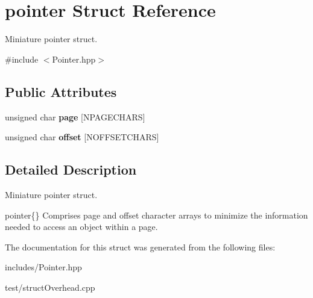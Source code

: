 \hypertarget{structpointer}{}\section{pointer Struct Reference}
\label{structpointer}


Miniature pointer struct.  




{\ttfamily \#include $<$Pointer.\+hpp$>$}

\subsection*{Public Attributes}
\begin{DoxyCompactItemize}
\item 
\mbox{\label{structpointer_acc59ccad1fba2ef333540ea3f8dae92b}} 
unsigned char {\bfseries page} \mbox{[}N\+P\+A\+G\+E\+C\+H\+A\+RS\mbox{]}
\item 
\mbox{\label{structpointer_afcea9aec1d2e53ca69ca8db631eff8e3}} 
unsigned char {\bfseries offset} \mbox{[}N\+O\+F\+F\+S\+E\+T\+C\+H\+A\+RS\mbox{]}
\end{DoxyCompactItemize}


\subsection{Detailed Description}
Miniature pointer struct. 

pointer\{\} Comprises page and offset character arrays to minimize the information needed to access an object within a page. 

The documentation for this struct was generated from the following files\+:\begin{DoxyCompactItemize}
\item 
includes/Pointer.\+hpp\item 
test/struct\+Overhead.\+cpp\end{DoxyCompactItemize}
